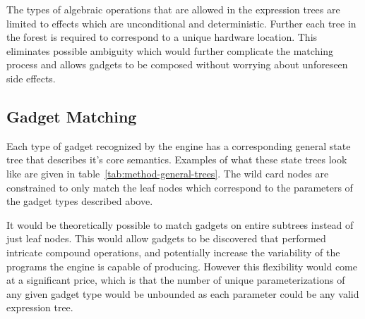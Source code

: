     The types of algebraic operations that are allowed in the expression trees
    are limited to effects which are unconditional and deterministic. Further
    each tree in the forest is required to correspond to a unique hardware
    location. This eliminates possible ambiguity which would further complicate
    the matching process and allows gadgets to be composed without worrying
    about unforeseen side effects.
    
    \subsection{Gadget Matching}

    Each type of gadget recognized by the engine has a corresponding general
    state tree that describes it's core semantics. Examples of what these state
    trees look like are given in table~\ref{tab:method-general-trees}. The wild
    card nodes are constrained to only match the leaf nodes which correspond to
    the parameters of the gadget types described above.

    It would be theoretically possible to match gadgets on entire subtrees
    instead of just leaf nodes. This would allow gadgets to be discovered that
    performed intricate compound operations, and potentially increase the
    variability of the programs the engine is capable of producing. However this
    flexibility would come at a significant price, which is that the number of
    unique parameterizations of any given gadget type would be unbounded as each
    parameter could be any valid expression tree.

